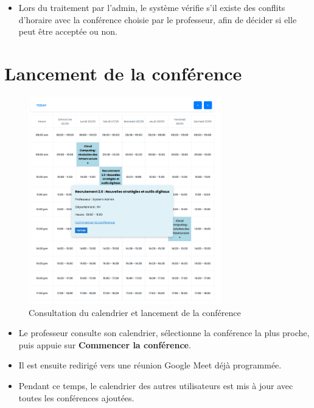 \documentclass{article}
\begin{document}
\begin{itemize}
    \item Lors du traitement par l'admin, le système vérifie s'il existe des conflits d'horaire avec la conférence choisie par le professeur, afin de décider si elle peut être acceptée ou non.
\end{itemize}

\section*{Lancement de la conférence}
\begin{figure}[H]
  \centering
  \includegraphics[height=9cm]{CALENDAR.png}
  \caption{Consultation du calendrier et lancement de la conférence}
  \label{fig:calendar}
\end{figure}
\begin{itemize}
    \item Le professeur consulte son calendrier, sélectionne la conférence la plus proche, puis appuie sur \textbf{Commencer la conférence}.
    \item Il est ensuite redirigé vers une réunion Google Meet déjà programmée.
    \item Pendant ce temps, le calendrier des autres utilisateurs est mis à jour avec toutes les conférences ajoutées.
\end{itemize}
\end{document}
